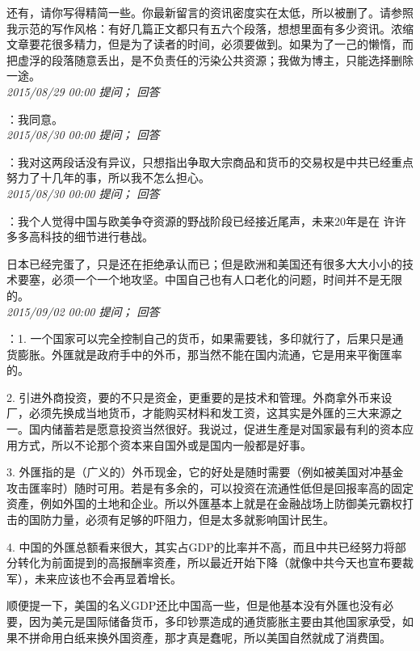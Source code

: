\documentclass[twocolumn]{ctexart}
\begin{document}
还有，请你写得精简一些。你最新留言的资讯密度实在太低，所以被删了。请参照我示范的写作风格：有好几篇正文都只有五六个段落，想想里面有多少资讯。浓缩文章要花很多精力，但是为了读者的时间，必须要做到。如果为了一己的懒惰，而把虚浮的段落随意丢出，是不负责任的污染公共资源；我做为博主，只能选择删除一途。\\

\textit{\hfill\noindent\small 2015/08/29 00:00 提问； 回答}

：我同意。\\

\textit{\hfill\noindent\small 2015/08/30 00:00 提问； 回答}

：我对这两段话没有异议，只想指出争取大宗商品和货币的交易权是中共已经重点努力了十几年的事，所以我不怎么担心。\\

\textit{\hfill\noindent\small 2015/08/30 00:00 提问； 回答}

：我个人觉得中国与欧美争夺资源的野战阶段已经接近尾声，未来20年是在 许许多多高科技的细节进行巷战。

日本已经完蛋了，只是还在拒绝承认而已；但是欧洲和美国还有很多大大小小的技术要塞，必须一个一个地攻坚。中国自己也有人口老化的问题，时间并不是无限的。\\

\textit{\hfill\noindent\small 2015/09/02 00:00 提问； 回答}

：1. 一个国家可以完全控制自己的货币，如果需要钱，多印就行了，后果只是通货膨胀。外匯就是政府手中的外币，那当然不能在国内流通，它是用来平衡匯率的。

2. 引进外商投资，要的不只是资金，更重要的是技术和管理。外商拿外币来设厂，必须先换成当地货币，才能购买材料和发工资，这其实是外匯的三大来源之一。国内储蓄若是愿意投资当然很好。我说过，促进生產是对国家最有利的资本应用方式，所以不论那个资本来自国外或是国内一般都是好事。

3. 外匯指的是（广义的）外币现金，它的好处是随时需要（例如被美国对冲基金攻击匯率时）随时可用。若是有多余的，可以投资在流通性低但是回报率高的固定资產，例如外国的土地和企业。所以外匯基本上就是在金融战场上防御美元霸权打击的国防力量，必须有足够的吓阻力，但是太多就影响国计民生。

4. 中国的外匯总额看来很大，其实占GDP的比率并不高，而且中共已经努力将部分转化为前面提到的高报酬率资產，所以最近开始下降（就像中共今天也宣布要裁军），未来应该也不会再显着增长。

顺便提一下，美国的名义GDP还比中国高一些，但是他基本没有外匯也没有必要，因为美元是国际储备货币，多印钞票造成的通货膨胀主要由其他国家承受，如果不拼命用白纸来换外国资產，那才真是蠢呢，所以美国自然就成了消费国。\\
\end{document}
